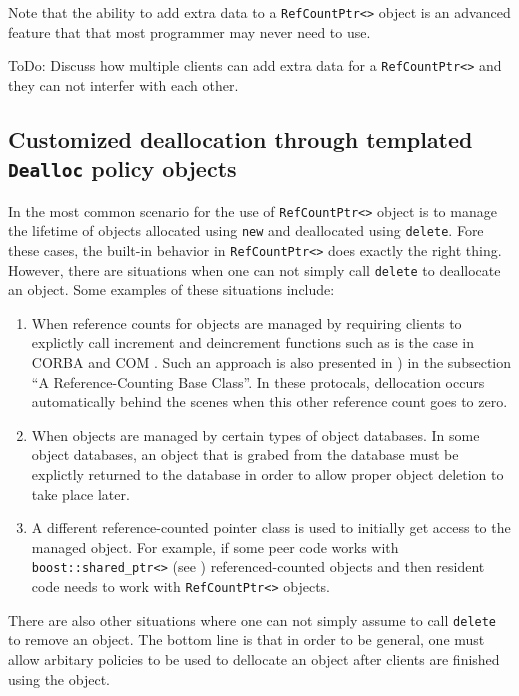 Note that the ability to add extra data to a {}\texttt{RefCountPtr<>}
object is an advanced feature that that most programmer may never need
to use.

ToDo: Discuss how multiple clients can add extra data for a
{}\texttt{RefCountPtr<>} and they can not interfer with each other.

%
\subsection{Customized deallocation through templated {}\texttt{Dealloc} policy objects}
\label{rcp:sec:dealloc}
%

In the most common scenario for the use of {}\texttt{RefCountPtr<>}
object is to manage the lifetime of objects allocated using
{}\texttt{new} and deallocated using {}\texttt{delete}.  Fore these
cases, the built-in behavior in {}\texttt{RefCountPtr<>} does exactly
the right thing.  However, there are situations when one can not
simply call {}\texttt{delete} to deallocate an object.  Some examples
of these situations include:
%
\begin{enumerate}
\item
When reference counts for objects are managed by requiring clients to
explictly call increment and deincrement functions such as is the case
in CORBA {}\cite{ref:corba} and COM {}\cite{ref:com}.  Such an
approach is also presented in {}\cite[Item 29]{ref:meyers_1996}) in
the subsection ``A Reference-Counting Base Class''.  In these
protocals, dellocation occurs automatically behind the scenes when
this other reference count goes to zero.
\item
When objects are managed by certain types of object databases.  In
some object databases, an object that is grabed from the database must
be explictly returned to the database in order to allow proper object
deletion to take place later.
\item
A different reference-counted pointer class is used to initially get
access to the managed object.  For example, if some peer code works
with {}\texttt{boost::shared\_ptr<>} (see {}\cite{ref:boost})
referenced-counted objects and then resident code needs to work with
{}\texttt{RefCountPtr<>} objects.
\end{enumerate}
%
There are also other situations where one can not simply assume to call
{}\texttt{delete} to remove an object.  The bottom line is that in order
to be general, one must allow arbitary policies to be used to
dellocate an object after clients are finished using the object.

